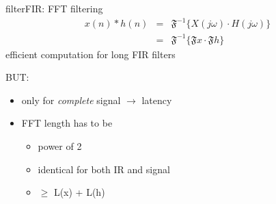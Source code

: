 	\begin{frame}{filter}{FIR: FFT filtering}
			\begin{eqnarray}
				x(n)\ast h(n) &=& \mathfrak{F}^{-1}\{X(j\omega)\cdot H(j\omega)\}\\
								&=&\mathfrak{F}^{-1}\{\mathfrak{F}{x}\cdot \mathfrak{F}{h}\}
			\end{eqnarray}
			efficient computation for long FIR filters
			
			\pause
			BUT:
			\begin{itemize}
				\item	only for \textit{complete} signal $\rightarrow$ latency
				\item	FFT length has to be
					\begin{itemize}
						\item	power of 2
						\item	identical for both IR and signal
						\item	$\geq$ L(x) + L(h) 
					\end{itemize}
			\end{itemize}
	\end{frame}
